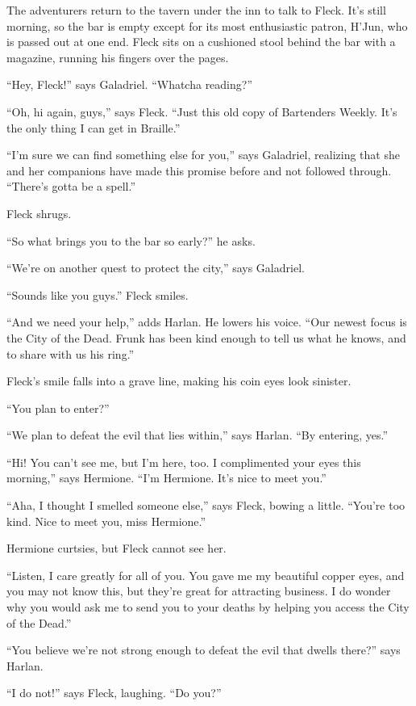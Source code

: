 \documentclass[smalldemyvopaper,11pt,twoside,onecolumn,openright,extrafontsizes]{memoir}
\begin{document}
The adventurers return to the tavern under the inn to talk to Fleck.
It's still morning, so the bar is empty except for its most enthusiastic
patron, H'Jun, who is passed out at one end. Fleck sits on a cushioned
stool behind the bar with a magazine, running his fingers over the
pages.

``Hey, Fleck!'' says Galadriel. ``Whatcha reading?''

``Oh, hi again, guys,'' says Fleck. ``Just this old copy of Bartenders
Weekly. It's the only thing I can get in Braille.''

``I'm sure we can find something else for you,'' says Galadriel,
realizing that she and her companions have made this promise before and
not followed through. ``There's gotta be a spell.''

Fleck shrugs.

``So what brings you to the bar so early?'' he asks.

``We're on another quest to protect the city,'' says Galadriel.

``Sounds like you guys.'' Fleck smiles.

``And we need your help,'' adds Harlan. He lowers his voice. ``Our
newest focus is the City of the Dead. Frunk has been kind enough to tell
us what he knows, and to share with us his ring.''

Fleck's smile falls into a grave line, making his coin eyes look
sinister.

``You plan to enter?''

``We plan to defeat the evil that lies within,'' says Harlan. ``By
entering, yes.''

``Hi! You can't see me, but I'm here, too. I complimented your eyes this
morning,'' says Hermione. ``I'm Hermione. It's nice to meet you.''

``Aha, I thought I smelled someone else,'' says Fleck, bowing a little.
``You're too kind. Nice to meet you, miss Hermione.''

Hermione curtsies, but Fleck cannot see her.

``Listen, I care greatly for all of you. You gave me my beautiful copper
eyes, and you may not know this, but they're great for attracting
business. I do wonder why you would ask me to send you to your deaths by
helping you access the City of the Dead.''

``You believe we're not strong enough to defeat the evil that dwells
there?'' says Harlan.

``I do not!'' says Fleck, laughing. ``Do you?''
\end{document}
